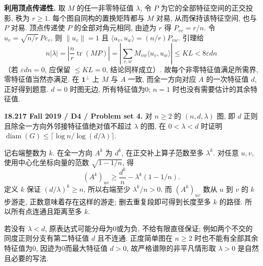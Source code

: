 \begin{solution}
\textbf{利用顶点传递性.}
取 $M$ 的任一非零特征值 $\lambda$, 令 $P$ 为它的全部特征空间的正交投影, 秩为 $r\ge1$. 每个图自同构的置换矩阵都与 $M$ 对易, 从而保持该特征空间, 也与 $P$ 对易. 顶点传递使 $P$ 的全部对角元相同, 由迹为 $r$ 得 $P_{vv}=r/n$. 令
$u_v=\sqrt{n/r}\,Pe_v$, 则 $\|u_v\|=1$ 且 $\langle u_v,u_w\rangle=(n/r)P_{vw}$. 引理给
\[
n|\lambda|
=\left|\frac nr\operatorname{tr}(MP)\right|
=\left|\sum_{v,w}M_{vw}\langle u_v,u_w\rangle\right|
\le KL<8\varepsilon dn
\]
（若 $\varepsilon dn=0$, 应保留 $\le KL=0$, 结论同样成立）. 故每个非零特征值满足所需界, 零特征值当然亦满足. 在 $\mathbf1^\perp$ 上 $M$ 与 $A$ 一致, 而全一方向对应 $A$ 的一次特征值 $d$, 正好得到题意. $d=0$ 时图无边, 所有特征值为0; $n=1$ 时也没有需要估计的其余特征值.
\end{solution}

\begin{exercise}\label{mit:18217-d4}
\textbf{18.217 Fall 2019 / D4 / Problem set 4.}
对 $n\ge2$ 的 $(n,d,\lambda)$ 图, 即 $d$ 正则且除全一方向外邻接特征值绝对值不超过 $\lambda$ 的图, 在 $0<\lambda<d$ 时证明
$\operatorname{diam}(G)\le\lceil\log n/\log(d/\lambda)\rceil$.
\end{exercise}
\begin{solution}
记右端整数为 $k$. 在全一方向 $A^k$ 为 $d^k$, 在正交补上算子范数至多 $\lambda^k$. 对任意 $u,v$, 使用中心化坐标向量的范数 $\sqrt{1-1/n}$, 得
\[
(A^k)_{uv}\ge\frac{d^k}{n}-\lambda^k(1-1/n).
\]
定义 $k$ 保证 $(d/\lambda)^k\ge n$, 所以右端至少 $\lambda^k/n>0$. 而 $(A^k)_{uv}$ 数从 $u$ 到 $v$ 的 $k$ 步游走, 正数意味着存在这样的游走; 删去重复段即可得到长度至多 $k$ 的路径. 所以所有点连通且距离至多 $k$.

若没有 $\lambda<d$, 原表达式可能分母为0或为负, 不给有限直径保证; 例如两个不交的同度正则分支有第二特征值 $d$ 且不连通. 正度简单图在 $n\ge2$ 时也不能有全部其余特征值为0, 因迹为0而最大特征值 $d>0$, 故严格谱隙的非平凡情形取 $\lambda>0$ 是自然且必要的写法.
\end{solution}

